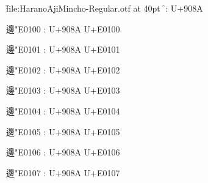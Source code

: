 

\nopagenumbers

\font\f{file:HaranoAjiMincho-Regular.otf} at 40pt \f

邊: U+908A\par
邊\char"E0100 : U+908A U+E0100\par
邊\char"E0101 : U+908A U+E0101\par
邊\char"E0102 : U+908A U+E0102\par
邊\char"E0103 : U+908A U+E0103\par
邊\char"E0104 : U+908A U+E0104\par
邊\char"E0105 : U+908A U+E0105\par
邊\char"E0106 : U+908A U+E0106\par
邊\char"E0107 : U+908A U+E0107\par

\bye
